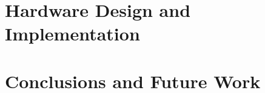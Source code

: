 \documentclass[a4paper]{report}
\begin{document}
\chapter{Hardware Design and Implementation}
\label{hardware}


\chapter{Conclusions and Future Work}
\label{conclusions}


\appendix


\glsaddall
\printglossary

\nocite{*}
\printbibliography
\end{document}
